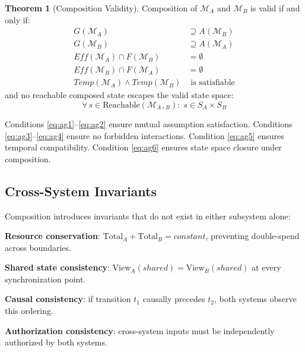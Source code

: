 \documentclass[11pt,a4paper]{article}
\theoremstyle{definition}
\newtheorem{theorem}{Theorem}[section]
\begin{document}
\begin{theorem}[Composition Validity]
\label{thm:composition-validity}
Composition of $\mathcal{M}_A$ and $\mathcal{M}_B$ is valid if and only if:
\begin{align}
G(\mathcal{M}_A) &\supseteq A(\mathcal{M}_B) \label{eq:ag1} \\
G(\mathcal{M}_B) &\supseteq A(\mathcal{M}_A) \label{eq:ag2} \\
\mathit{Eff}(\mathcal{M}_A) \cap F(\mathcal{M}_B) &= \emptyset \label{eq:ag3} \\
\mathit{Eff}(\mathcal{M}_B) \cap F(\mathcal{M}_A) &= \emptyset \label{eq:ag4} \\
\mathit{Temp}(\mathcal{M}_A) \land \mathit{Temp}(\mathcal{M}_B) &\text{ is satisfiable} \label{eq:ag5}
\end{align}
and no reachable composed state escapes the valid state space:
\begin{equation}
\forall\, s \in \mathrm{Reachable}(\mathcal{M}_{A \circ B}):\; s \in S_A \times S_B \label{eq:ag6}
\end{equation}
\end{theorem}

Conditions \eqref{eq:ag1}--\eqref{eq:ag2} ensure mutual assumption satisfaction. Conditions \eqref{eq:ag3}--\eqref{eq:ag4} ensure no forbidden interactions. Condition \eqref{eq:ag5} ensures temporal compatibility. Condition \eqref{eq:ag6} ensures state space closure under composition.

\subsection{Cross-System Invariants}
\label{subsec:cross-invariants}

Composition introduces invariants that do not exist in either subsystem alone:

\noindent\textbf{Resource conservation}: $\mathrm{Total}_A + \mathrm{Total}_B = \mathit{constant}$, preventing double-spend across boundaries.

\noindent\textbf{Shared state consistency}: $\mathrm{View}_A(\mathit{shared}) = \mathrm{View}_B(\mathit{shared})$ at every synchronization point.

\noindent\textbf{Causal consistency}: if transition $t_1$ causally precedes $t_2$, both systems observe this ordering.

\noindent\textbf{Authorization consistency}: cross-system inputs must be independently authorized by both systems.
\end{document}
